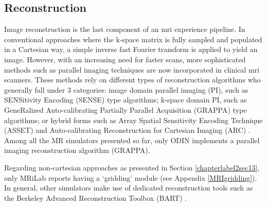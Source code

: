 \hfill

\subsection{Reconstruction}

Image reconstruction is the last component of an \ac{mri} experience pipeline.
In conventional approaches where the k-space matrix is fully sampled and populated in a Cartesian way, a simple inverse fast Fourier transform is applied to yield an image.
However, with an increasing need for faster scans, more sophisticated methods such as parallel imaging techniques are now incorporated in clinical \ac{mri} scanners.
These methods rely on different types of reconstruction algorithms who generally fall under 3 categories: image domain parallel imaging (PI), such as SENSitivity Encoding (SENSE) type algorithms; k-space domain PI, such as GeneRalized Auto-calibrating Partially Parallel Acquisition (GRAPPA) type algorithms; or hybrid forms such as Array Spatial Sensitivity Encoding Technique (ASSET) and Auto-calibrating Reconstruction for Cartesian Imaging (ARC) \cite{Deshmane2012}.
Among all the MR simulators presented so far, only ODIN \cite{Jochimsen2004} implements a parallel imaging reconstruction algorithm (GRAPPA).

\hfill

Regarding non-cartesian approaches as presented in Section \ref{chapterlabel2sec13}, only MRiLab \cite{Liu2017} reports having a `gridding' module (see Appendix \ref{MRIgridding}).
In general, other simulators make use of dedicated reconstruction tools such as the Berkeley Advanced Reconstruction Toolbox (BART) \cite{Lustig2016}.
